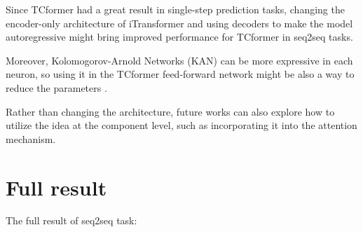 \documentclass[stu,12pt,floatsintext]{apa7}
\begin{document}
Since TCformer had a great result in single-step prediction tasks, changing the encoder-only architecture of iTransformer and using decoders to make the model autoregressive might bring improved performance for TCformer in seq2seq tasks. 

Moreover, Kolomogorov-Arnold Networks (KAN) can be more expressive in each neuron, so using it in the TCformer feed-forward network might be also a way to reduce the parameters \cite{kan}. 

Rather than changing the architecture, future works can also explore how to utilize the idea at the component level, such as incorporating it into the attention mechanism. 

\printbibliography

\appendix
\label{sec:full-result}
\section{Full result}
The full result of seq2seq task:
\end{document}
